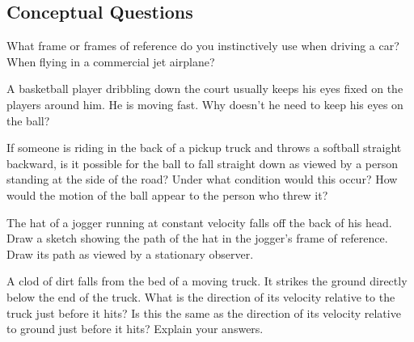 \documentclass[
]{book}
\newenvironment{conceptual-questions}{}{}
\begin{document}
\hypertarget{fs-id1894444}{}
\begin{conceptual-questions}

\hypertarget{conceptual-questions-10}{%
\subsection{Conceptual Questions}\label{conceptual-questions-10}}

\hypertarget{fs-id1125168}{}
\leavevmode\hypertarget{fs-id1125169}{}%
What frame or frames of reference do you instinctively use when driving
a car? When flying in a commercial jet airplane?

\hypertarget{fs-id1462868}{}
\leavevmode\hypertarget{fs-id1936006}{}%
A basketball player dribbling down the court usually keeps his eyes
fixed on the players around him. He is moving fast. Why doesn't he need
to keep his eyes on the ball?

\hypertarget{fs-id1635072}{}
\leavevmode\hypertarget{fs-id1635073}{}%
If someone is riding in the back of a pickup truck and throws a softball
straight backward, is it possible for the ball to fall straight down as
viewed by a person standing at the side of the road? Under what
condition would this occur? How would the motion of the ball appear to
the person who threw it?

\hypertarget{fs-id1912925}{}
\leavevmode\hypertarget{fs-id1912926}{}%
The hat of a jogger running at constant velocity falls off the back of
his head. Draw a sketch showing the path of the hat in the jogger's
frame of reference. Draw its path as viewed by a stationary observer.

\hypertarget{fs-id1551935}{}
\leavevmode\hypertarget{fs-id1551936}{}%
A clod of dirt falls from the bed of a moving truck. It strikes the
ground directly below the end of the truck. What is the direction of its
velocity relative to the truck just before it hits? Is this the same as
the direction of its velocity relative to ground just before it hits?
Explain your answers.

\end{conceptual-questions}
\end{document}
